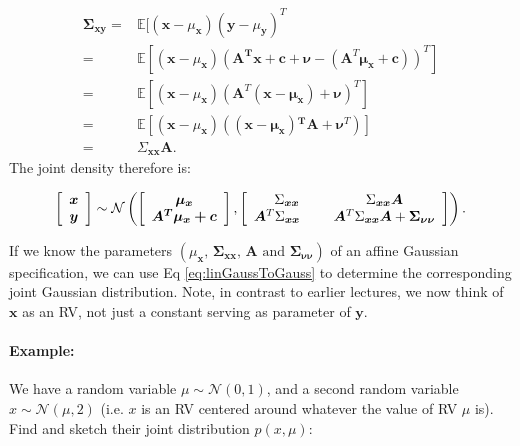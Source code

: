 \begin{align*}
\bm{\Sigma}_{\bm{xy}}= & \mathbb{E}[(\bm{x}-\mu_{\bm{x}})(\bm{y}-\mu_{\bm{y}})^{T}\\
= & \mathbb{E}[(\bm{x}-\mu_{\bm{x}})(\bm{\bm{A}^{T}\bm{x}}+\bm{\bm{c}}+\bm{\bm{\nu}}-(\bm{A}^{T}\bm{\mu_{\bm{x}}}+\bm{c}))^{T}]\\
= & \mathbb{E}[(\bm{x}-\mu_{\bm{x}})(\bm{A}^{T}(\bm{\bm{x}}-\bm{\mu_{\bm{x}}})+\bm{\bm{\nu}})^{T}]\\
= & \mathbb{E}[(\bm{x}-\mu_{\bm{x}})(\bm{(\bm{\bm{x}}-\bm{\mu_{\bm{x}}}){}^{T}A}+\bm{\bm{\nu}}^{T})]\\
= & \Sigma_{\bm{xx}}\bm{A}.
\end{align*}
The joint density therefore is:

\begin{equation}
\left[\begin{array}{c}
\bm{x}\\
\bm{y}
\end{array}\right]\sim\mathcal{N}\left(\left[\begin{array}{c}
\bm{\mu_{\bm{x}}}\\
\bm{\bm{A}^{T}\bm{\mu_{\bm{x}}}+\bm{c}}
\end{array}\right],\left[\begin{array}{cc}
\Sigma_{\bm{xx}} & \Sigma_{\bm{xx}}\bm{A}\\
\bm{A}^{T}\Sigma_{\bm{xx}}\hspace{5mm} & \bm{A}^{T}\Sigma_{\bm{xx}}\bm{A}+\bm{\Sigma}_{\bm{\nu\nu}}
\end{array}\right]\right).  \label{eq:linGaussToGauss}
\end{equation}

If we know the parameters
$(\mu_{\bm{x}},\bm{\,\Sigma}_{\bm{xx}},\,\bm{A} \text{ and } \bm{\Sigma}_{\bm{\nu\nu}})$ of an affine Gaussian specification, we
can use Eq \ref{eq:linGaussToGauss} to determine the corresponding
joint Gaussian distribution. Note, in contrast to earlier lectures, we
now think of $\bm{x}$ as an RV, not just a constant serving as parameter
of $\bm{y}$.


\paragraph{Example:}

We have a random variable $\mu\sim\mathcal{N}(0,1)$, and a second
random variable $x\sim\mathcal{N}(\mu,2)$ (i.e. $x$ is an RV centered
around whatever the value of RV $\mu$ is). Find and sketch their joint
distribution $p(x,\mu)$:

